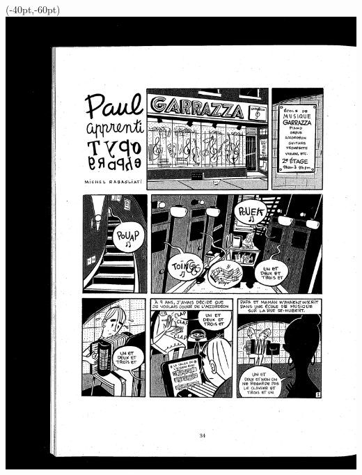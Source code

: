 \begin{textblock*}{110pt}(-40pt,-60pt)
  \includegraphics[angle=180]{paul-apprenti-typographe/paul-titre}
\end{textblock*}
\null\clearpage

